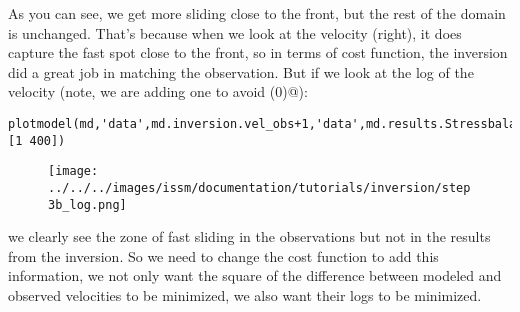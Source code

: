 As you can see, we get more sliding close to the front, but the rest of the domain is unchanged. That's because when we look at the velocity (right), it does capture the fast spot close to the front, so in terms of cost function, the inversion did a great job in matching the observation. But if we look at the log of the velocity (note, we are adding one to avoid \verb@log(0)@):
\begin{verbatim}plotmodel(md,'data',md.inversion.vel_obs+1,'data',md.results.StressbalanceSolution.Vel+1,'log#all',10,'caxis#all',[1 400])
\end{verbatim}
\begin{figure}[H]
	\begin{center}
		\texttt{[image: ../../../images/issm/documentation/tutorials/inversion/step3b\_log.png]}
	\end{center}
\end{figure}
we clearly see the zone of fast sliding in the observations but not in the results from the inversion. So we need to change the cost function to add this information, we not only want the square of the difference between modeled and observed velocities to be minimized, we also want their logs to be minimized.

